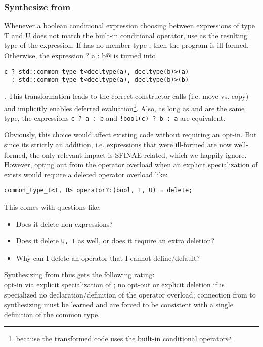 \subsubsection{Synthesize from }\label{sec:from common_type}

Whenever a boolean conditional expression choosing between expressions of type \type T and \type U does not match the built-in conditional operator, use  as the resulting type of the expression.
If  has no member type , then the program is ill-formed.
Otherwise, the expression \lstinline@c ? a : b@ is turned into
\medskip\begin{lstlisting}[style=Vc]
c ? std::common_type_t<decltype(a), decltype(b)>(a)
  : std::common_type_t<decltype(a), decltype(b)>(b)
\end{lstlisting}.
This transformation leads to the correct constructor calls (i.e. move vs. copy) and implicitly enables deferred evaluation\footnote{because the transformed code uses the built-in conditional operator}.
Also, as long as  and  are the same type, the expressions \lstinline[style=Vc]@c ? a : b@ and \lstinline[style=Vc]@!bool(c) ? b : a@ are equivalent.

Obviously, this choice would affect existing code without requiring an opt-in.
But since its strictly an addition, i.e. expressions that were ill-formed are now well-formed, the only relevant impact is SFINAE related, which we happily ignore.
However, opting out from the operator overload when an explicit specialization of  exists would require a deleted operator overload like:
\medskip\begin{lstlisting}[style=Vc]
common_type_t<T, U> operator?:(bool, T, U) = delete;
\end{lstlisting}
This comes with questions like:
\begin{itemize}
\item Does it delete non-\bool expressions?
\item Does it delete \lstinline[style=Vc]@U, T@ as well, or does it require an extra deletion?
\item Why can I delete an operator that I cannot define/default?
\end{itemize}

Synthesizing from  thus gets the following rating:\\
\greatnesstable
{\undecided opt-in via explicit specialization of ; no opt-out or explicit deletion if  is specialized}
{\bad no declaration/definition of the operator overload; connection from  to synthesizing  must be learned}
{\good}
{\good}
{\good {} and  are forced to be consistent with a single definition of the common type.}

